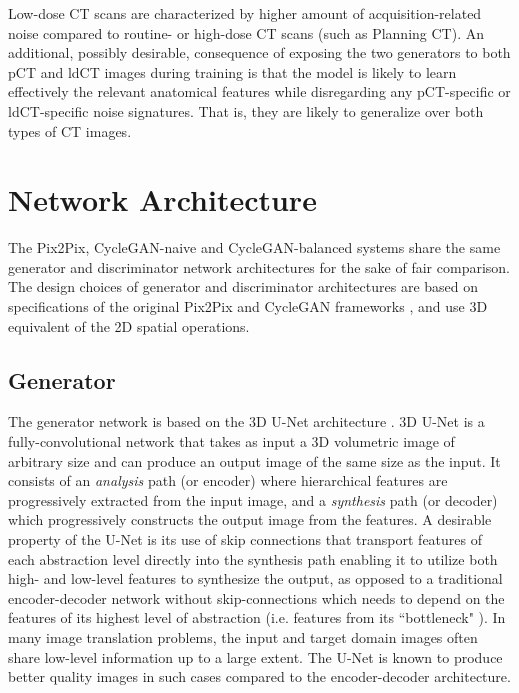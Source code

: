 Low-dose CT scans are characterized by higher amount of acquisition-related noise compared to routine- or high-dose CT scans (such as Planning CT). An additional, possibly desirable, consequence of exposing the two generators to both pCT and ldCT images during training is that the model is likely to learn effectively the relevant anatomical features while disregarding any pCT-specific or ldCT-specific noise signatures. That is, they are likely to generalize over both types of CT images.


\section{Network Architecture}
\label{network_architectures}
The Pix2Pix, CycleGAN-naive and CycleGAN-balanced systems share the same generator and discriminator network architectures for the sake of fair comparison. The design choices of generator and discriminator architectures are based on specifications of the original Pix2Pix and CycleGAN frameworks \cite{isola2017image, zhu2017unpaired}, and use 3D equivalent of the 2D spatial operations.

\subsection{Generator}
The generator network is based on the 3D U-Net architecture \cite{cciccek20163d}. 3D U-Net is a fully-convolutional network that takes as input a 3D volumetric image of arbitrary size and can produce an output image of the same size as the input. It consists of an \textit{analysis} path (or encoder) where hierarchical features are progressively extracted from the input image, and a \textit{synthesis} path (or decoder) which progressively constructs the output image from the features. A desirable property of the U-Net is its use of skip connections that transport features of each abstraction level directly into the synthesis path enabling it to utilize both high- and low-level features to synthesize the output, as opposed to a traditional encoder-decoder network without skip-connections which needs to depend on the features of its highest level of abstraction (i.e. features from its ``bottleneck" ). In many image translation problems, the input and target domain images often share low-level information up to a large extent. The U-Net is known to produce better quality images \cite{isola2017image} in such cases compared to the encoder-decoder architecture.

